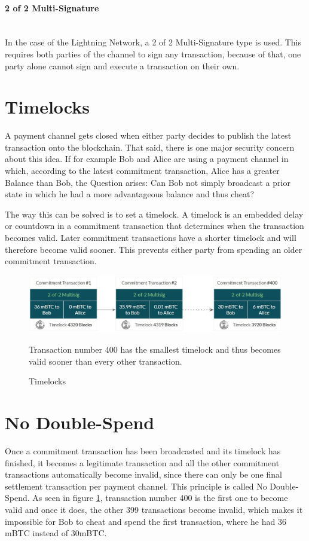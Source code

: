 \documentclass[a4paper, 12pt]{report}
\begin{document}
\paragraph{2 of 2 Multi-Signature} \hspace{0pt} \\
In the case of the Lightning Network, a 2 of 2 Multi-Signature type is used. This requires both parties of the channel to sign any transaction, because of that, one party alone cannot sign and execute a transaction on their own.

\section{Timelocks}
\par A payment channel gets closed when either party decides to publish the latest transaction onto the blockchain. That said, there is one major security concern about this idea. If for example Bob and Alice are using a payment channel in which, according to the latest commitment transaction, Alice has a greater Balance than Bob, the Question arises: Can Bob not simply broadcast a prior state in which he had a more advantageous balance and thus cheat?

\par The way this can be solved is to set a timelock. A timelock is an embedded delay or countdown in a commitment transaction that determines when the transaction becomes valid. Later commitment transactions have a shorter timelock and will therefore become valid sooner. This prevents either party from spending an older commitment transaction.

\begin{figure}[h]
	\centering
	\includegraphics[width=13cm]{06_Timelocks}
	\caption{Timelocks}
	\medskip
	\small Transaction number 400 has the smallest timelock and thus becomes valid sooner than every other transaction.
	\label{fig:06_Timelocks}
\end{figure}

\section{No Double-Spend}
\par Once a commitment transaction has been broadcasted and its timelock has finished, it becomes a legitimate transaction and all the other commitment transactions automatically become invalid, since there can only be one final settlement transaction per payment channel. This principle is called No Double-Spend.  As seen in figure \ref{fig:06_Timelocks}, transaction number 400 is the first one to become valid and once it does, the other 399 transactions become invalid, which makes it impossible for Bob to cheat and spend the first transaction, where he had 36 mBTC instead of 30mBTC.
\end{document}
